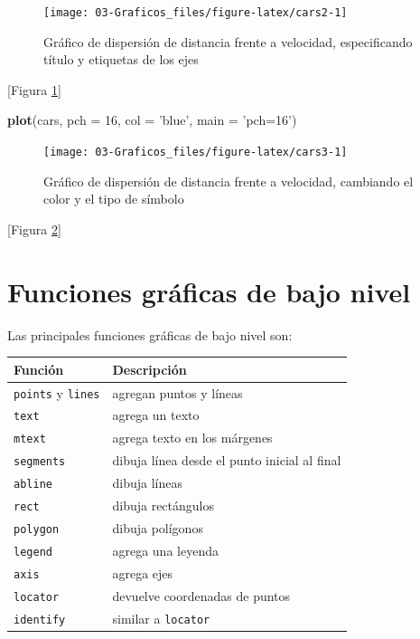 \documentclass[]{book}
\newenvironment{Shaded}{\begin{snugshade}}{\end{snugshade}}
\newcommand{\DataTypeTok}[1]{\textcolor[rgb]{0.13,0.29,0.53}{#1}}
\newcommand{\DecValTok}[1]{\textcolor[rgb]{0.00,0.00,0.81}{#1}}
\newcommand{\KeywordTok}[1]{\textcolor[rgb]{0.13,0.29,0.53}{\textbf{#1}}}
\newcommand{\NormalTok}[1]{#1}
\newcommand{\StringTok}[1]{\textcolor[rgb]{0.31,0.60,0.02}{#1}}
\begin{document}
\begin{figure}[!htb]

{\centering \texttt{[image: 03-Graficos\_files/figure-latex/cars2-1]} 

}

\caption{Gráfico de dispersión de distancia frente a velocidad, especificando título y etiquetas de los ejes}\label{fig:cars2}
\end{figure}

{[}Figura \ref{fig:cars2}{]}

\begin{Shaded}
\begin{Highlighting}[]
\KeywordTok{plot}\NormalTok{(cars, }\DataTypeTok{pch =} \DecValTok{16}\NormalTok{, }\DataTypeTok{col =} \StringTok{'blue'}\NormalTok{, }\DataTypeTok{main =} \StringTok{'pch=16'}\NormalTok{)}
\end{Highlighting}
\end{Shaded}

\begin{figure}[!htb]

{\centering \texttt{[image: 03-Graficos\_files/figure-latex/cars3-1]} 

}

\caption{Gráfico de dispersión de distancia frente a velocidad, cambiando el color y el tipo de símbolo}\label{fig:cars3}
\end{figure}

{[}Figura \ref{fig:cars3}{]}

\hypertarget{funciones-graficas-de-bajo-nivel}{%
\section{Funciones gráficas de bajo nivel}\label{funciones-graficas-de-bajo-nivel}}

Las principales funciones gráficas de bajo nivel son:

\begin{longtable}[]{@{}ll@{}}
\toprule
Función & Descripción\tabularnewline
\midrule
\endhead
\texttt{points} y \texttt{lines} & agregan puntos y líneas\tabularnewline
\texttt{text} & agrega un texto\tabularnewline
\texttt{mtext} & agrega texto en los márgenes\tabularnewline
\texttt{segments} & dibuja línea desde el punto inicial al final\tabularnewline
\texttt{abline} & dibuja líneas\tabularnewline
\texttt{rect} & dibuja rectángulos\tabularnewline
\texttt{polygon} & dibuja polígonos\tabularnewline
\texttt{legend} & agrega una leyenda\tabularnewline
\texttt{axis} & agrega ejes\tabularnewline
\texttt{locator} & devuelve coordenadas de puntos\tabularnewline
\texttt{identify} & similar a \texttt{locator}\tabularnewline
\bottomrule
\end{longtable}
\end{document}

